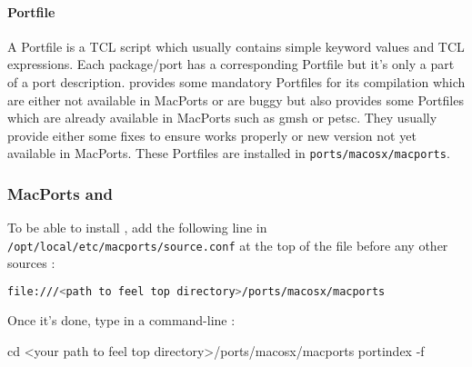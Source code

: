 \paragraph{Portfile}
A Portfile is a TCL script which usually contains simple keyword values and TCL expressions. Each package/port has a corresponding Portfile but it's only a part of a port description.
\feel provides some mandatory Portfiles for its compilation which are either not available in MacPorts or are buggy but \feel also provides some Portfiles which are already available in MacPorts such as gmsh or petsc. They usually provide either some fixes to ensure \feel works properly or new version not yet available in MacPorts.
These Portfiles are installed in \lstinline|ports/macosx/macports|.


\subsubsection{MacPorts and \Feel}


To be able to install \feel, add the following line in \lstinline|/opt/local/etc/macports/source.conf|
at the top of the file before any other sources :
\begin{lstlisting}[language=sh]
file:///<path to feel top directory>/ports/macosx/macports
\end{lstlisting}

Once it's done, type in a command-line :
\begin{unixcom}
		cd <your path to feel top directory>/ports/macosx/macports
		portindex -f
\end{unixcom}

